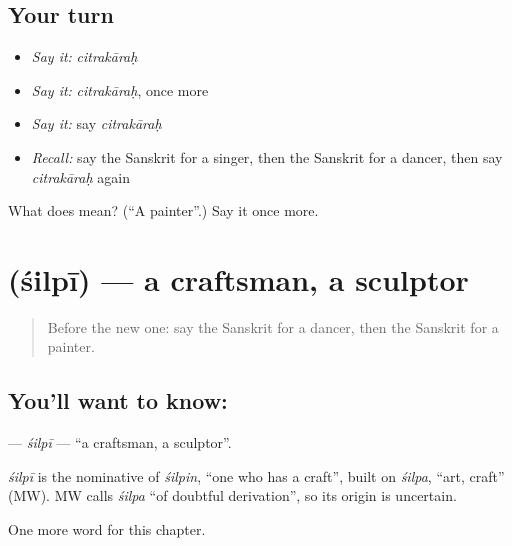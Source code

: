 \subsection*{Your turn}
\begin{itemize}
\raggedright
  \item \emph{Say it:} \emph{citrakāraḥ}
  \item \emph{Say it:} \emph{citrakāraḥ}, once more
  \item \emph{Say it:} say \emph{citrakāraḥ}
  \item \emph{Recall:} say the Sanskrit for a singer, then the Sanskrit for a dancer, then say \emph{citrakāraḥ} again
\end{itemize}

\begin{tcolorbox}[breakable,colback=teal!4,colframe=teal!35!black,title={Before you move on}]
What does  mean? (\textquotedblleft{}A painter\textquotedblright{}.) Say it once more.
\end{tcolorbox}
\section[\texorpdfstring{\sk{शिल्पी} (śilpī)}{शिल्पी (śilpī)}]{ (śilpī) — a craftsman, a sculptor}

\label{lesson:SA-C209-silpi}



\begin{quote}
Before the new one: say the Sanskrit for a dancer, then the Sanskrit for a painter.
\end{quote}

\subsection*{You'll want to know: }
\textbf{} — \emph{śilpī} — \textquotedblleft{}a craftsman, a sculptor\textquotedblright{}.

\begin{cousinweb}
\emph{śilpī} is the nominative of \emph{śilpin}, \textquotedblleft{}one who has a craft\textquotedblright{}, built on \emph{śilpa}, \textquotedblleft{}art, craft\textquotedblright{} (MW). MW calls \emph{śilpa} \textquotedblleft{}of doubtful derivation\textquotedblright{}, so its origin is uncertain.
\end{cousinweb}

\begin{grammarlens}[title={What you've built}]
One more word for this chapter.
\end{grammarlens}

